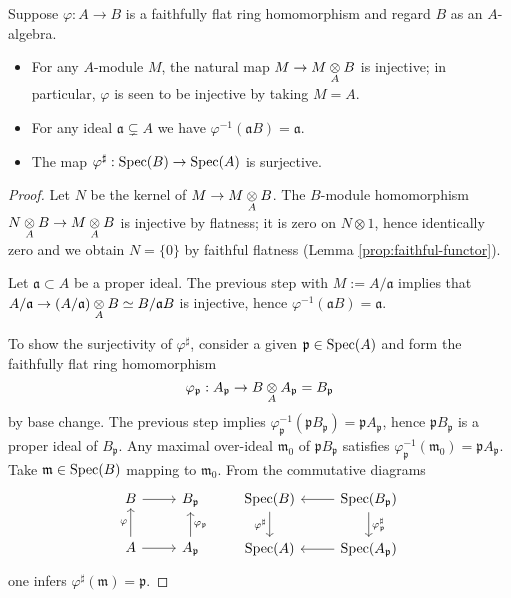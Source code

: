 \begin{proposition}\label{prop:faithfully-flat-surj}
	Suppose $\varphi: A \to B$ is a faithfully flat ring homomorphism and regard $B$ as an $A$-algebra.
	\begin{itemize}
		\item For any $A$-module $M$, the natural map $M \to M \underset{A}{\otimes} B$ is injective; in particular, $\varphi$ is seen to be injective by taking $M=A$.
		\item For any ideal $\mathfrak{a} \subsetneq A$ we have $\varphi^{-1}(\mathfrak{a}B)=\mathfrak{a}$.
		\item The map $\varphi^\sharp: \operatorname{Spec}(B) \to \operatorname{Spec}(A)$ is surjective.
	\end{itemize}
\end{proposition}
\begin{proof}
	Let $N$ be the kernel of $M \to M \underset{A}{\otimes} B$. The $B$-module homomorphism $N \underset{A}{\otimes} B \to M \underset{A}{\otimes} B$ is injective by flatness; it is zero on $N \otimes 1$, hence identically zero and we obtain $N = \{0\}$ by faithful flatness (Lemma \ref{prop:faithful-functor}). 

	
	Let $\mathfrak{a} \subset A$ be a proper ideal. The previous step with $M := A/\mathfrak{a}$ implies that $A/\mathfrak{a} \to (A/\mathfrak{a}) \underset{A}{\otimes} B \simeq B/\mathfrak{a}B$ is injective, hence $\varphi^{-1}(\mathfrak{a}B) = \mathfrak{a}$.
	
	To show the surjectivity of $\varphi^\sharp$, consider a given $\mathfrak{p} \in \operatorname{Spec}(A)$ and form the faithfully flat ring homomorphism
	\[ \varphi_{\mathfrak{p}}: A_{\mathfrak{p}} \to B \underset{A}{\otimes} A_{\mathfrak{p}} = B_{\mathfrak{p}} \]
	by base change. The previous step implies $\varphi_{\mathfrak{p}}^{-1}(\mathfrak{p}B_{\mathfrak{p}}) = \mathfrak{p} A_{\mathfrak{p}}$, hence $\mathfrak{p}B_{\mathfrak{p}}$ is a proper ideal of $B_{\mathfrak{p}}$. Any maximal over-ideal $\mathfrak{m}_0$ of $\mathfrak{p}B_{\mathfrak{p}}$ satisfies $\varphi^{-1}_{\mathfrak{p}}(\mathfrak{m}_0) = \mathfrak{p} A_{\mathfrak{p}}$. Take $\mathfrak{m} \in \operatorname{Spec}(B)$ mapping to $\mathfrak{m}_0$. From the commutative diagrams
	\[\begin{tikzcd}
		B \arrow[r] & B_{\mathfrak{p}} \\
		A \arrow[u, "\varphi"] \arrow[r] & A_{\mathfrak{p}} \arrow[u, "\varphi_{\mathfrak{p}}"']
	\end{tikzcd} \qquad \begin{tikzcd}
		\Spec(B) \arrow[d, "\varphi^\sharp"'] & \Spec(B_{\mathfrak{p}}) \arrow[d, "\varphi_{\mathfrak{p}}^\sharp"] \arrow[l] \\
		\Spec(A) & \Spec(A_{\mathfrak{p}}) \arrow[l]
	\end{tikzcd}\]
	one infers $\varphi^\sharp(\mathfrak{m}) = \mathfrak{p}$.
\end{proof}

